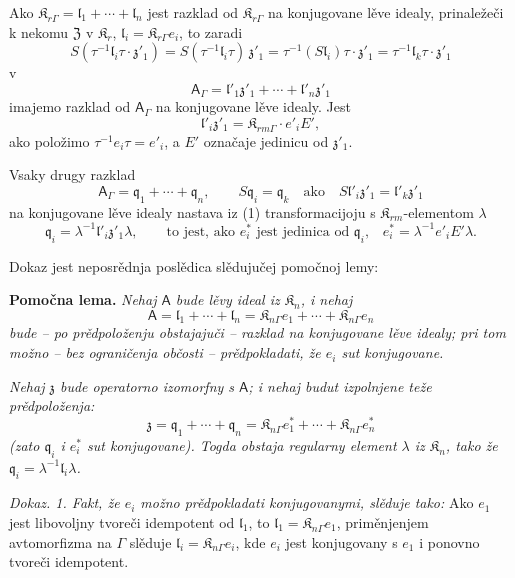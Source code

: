 \documentclass[11pt]{article}
\begin{document}
Ako \(\mathfrak K_{r\Gamma}=\mathfrak l_1+\cdots+\mathfrak l_n\) jest razklad od \(\mathfrak K_{r\Gamma}\) na konjugovane lěve idealy, prinaležeči k nekomu \(\mathfrak Z\) v \(\mathfrak K_r\), \(\mathfrak l_i=\mathfrak K_{r\Gamma}e_i\), to zaradi
\[
S(\tau^{-1}\mathfrak l_i\tau\cdot\mathfrak z'_1)
=S(\tau^{-1}\mathfrak l_i\tau)\,\mathfrak z'_1
=\tau^{-1}(S\mathfrak l_i)\tau\cdot\mathfrak z'_1
=\tau^{-1}\mathfrak l_k\tau\cdot\mathfrak z'_1
\]
v
\[
\tag{1}
\mathsf{A}_\Gamma=\mathfrak l'_1\mathfrak z'_1+\cdots+\mathfrak l'_n\mathfrak z'_1
\]
imajemo razklad od \(\mathsf{A}_\Gamma\) na konjugovane lěve idealy. Jest
\[
\mathfrak l'_i\mathfrak z'_1=\mathfrak K_{rm\Gamma}\cdot e'_iE',
\]
ako položimo \(\tau^{-1}e_i\tau=e'_i\), a \(E'\) označaje jedinicu od \(\mathfrak z'_1\).

Vsaky drugy razklad
\[
\tag{2}
\mathsf{A}_\Gamma=\mathfrak q_1+\cdots+\mathfrak q_n,\qquad
S\mathfrak q_i=\mathfrak q_k\quad\text{ako}\quad
S\mathfrak l'_i\mathfrak z'_1=\mathfrak l'_k\mathfrak z'_1
\]
na konjugovane lěve idealy nastava iz (1) transformacijoju s \(\mathfrak K_{rm}\)-elementom \(\lambda\)
\[
\mathfrak q_i=\lambda^{-1}\mathfrak l'_i\mathfrak z'_1\lambda,
\qquad
\text{to jest, ako \(e_i^*\) jest jedinica od \(\mathfrak q_i\),}\quad
e_i^*=\lambda^{-1}e'_iE'\lambda.
\]

Dokaz jest neposrědnja poslědica slědujučej pomočnoj lemy:

\textbf{Pomočna lema.} \emph{Nehaj \(\mathsf{A}\) bude lěvy ideal iz \(\mathfrak K_n\), i nehaj}
\[
\mathsf{A}=\mathfrak l_1+\cdots+\mathfrak l_n
=\mathfrak K_{n\Gamma}e_1+\cdots+\mathfrak K_{n\Gamma}e_n
\]
\emph{bude -- po prědpoloženju obstajajuči -- razklad na konjugovane lěve idealy; pri tom možno -- bez ograničenja občosti -- prědpokladati, že \(e_i\) sut konjugovane.}

\emph{Nehaj \(\mathfrak z\) bude operatorno izomorfny s \(\mathsf{A}\); i nehaj budut izpolnjene teže prědpoloženja:}
\[
\mathfrak z=\mathfrak q_1+\cdots+\mathfrak q_n
=\mathfrak K_{n\Gamma}e_1^*+\cdots+\mathfrak K_{n\Gamma}e_n^*
\]
\emph{(zato \(\mathfrak q_i\) i \(e_i^*\) sut konjugovane). Togda obstaja regularny element \(\lambda\) iz \(\mathfrak K_n\), tako že \(\mathfrak q_i=\lambda^{-1}\mathfrak l_i\lambda\).}

\emph{Dokaz. 1. Fakt, že \(e_i\) možno prědpokladati konjugovanymi, slěduje tako:} Ako \(e_1\) jest libovoljny tvoreči idempotent od \(\mathfrak l_1\), to \(\mathfrak l_1=\mathfrak K_{n\Gamma}e_1\), priměnjenjem avtomorfizma na \(\Gamma\) slěduje \(\mathfrak l_i=\mathfrak K_{n\Gamma}e_i\), kde \(e_i\) jest konjugovany s \(e_1\) i ponovno tvoreči idempotent.
\end{document}
